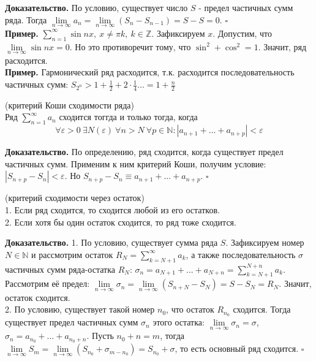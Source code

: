 \textbf{Доказательство.} По условию, существует число $S$ - предел частичных 
сумм ряда.
Тогда $\lim\limits_{n \to \infty}a_n=\lim\limits_{n \to \infty}(S_{n}-S_{n-1})
=S-S=0$. 
$\square$\\
\textbf{Пример.} $\sum\limits_{n=1}^{\infty} \sin{nx},~x\ne\pi k,~k 
\in\mathbb{Z}$. 
Зафиксируем $x$. Допустим, что $\lim\limits_{n \to \infty}\sin nx=0 $. 
Но это противоречит тому, что $\sin^2+\cos^2=1$. Значит, ряд расходится.\\
\textbf{Пример.} Гармонический ряд расходится, т.к. расходится 
последовательность частичных сумм: 
$S_{2^n}>1+\frac{1}{2}+2\cdot \frac{1}{4}\ldots=1+\frac{n}{2}$
\begin{theor} (критерий Коши сходимости ряда)\\
Ряд $\sum\limits_{n=1}^{\infty} a_n$ сходится тоггда и только тогда, когда
$$\forall\varepsilon>0~\exists N(\varepsilon)~\forall n>N~\forall p\in
\mathbb{N}:|a_{n+1}+\ldots+a_{n+p}|<\varepsilon$$
\end{theor}
\textbf{Доказательство.} По определению, ряд сходится, когда существует предел
частичных сумм. Применим к ним критерий Коши, получим условие: 
$|S_{n+p}-S_n|<\varepsilon$. Но $S_{n+p}-S_n\equiv a_{n+1}+...+a_{n+p}$.
$\square$ 
\begin{theor} (критерий сходимости через остаток)\\
    1. Если ряд сходится, то сходится любой из его остатков.\\
    2. Если хотя бы один остаток сходится, то ряд тоже сходится.
\end{theor}
\textbf{Доказательство.}
1. По условию, существует сумма ряда $S$. Зафиксируем номер $N\in\mathbb{N}$ и 
рассмотрим остаток $R_N=\sum\limits_{k=N+1}^{\infty} a_k$, а также 
последовательность $\sigma$ частичных сумм ряда-остатка $R_N$: 
$\sigma_n=a_{N+1}+...+a_{N+n}=\sum\limits_{k=N+1}^{N+n} a_k$.
Рассмотрим её предел:
$\lim\limits_{n \to \infty} \sigma_n=\lim\limits_{n \to \infty}(S_{n+N}-S_N)
=S-S_N=R_N$. Значит, остаток сходится.\\
2. По условию, существует такой номер $n_0$, что остаток $R_{n_0}$ сходится.
Тогда существует предел частичных сумм $\sigma_n$ этого остатка:
$\lim\limits_{n \to \infty}\sigma_n=\sigma$, 
$\sigma_n=a_{n_0}+\ldots+a_{n_0+n}$. Пусть $n_0+n=m$, тогда
$\lim\limits_{n \to \infty}S_m=\lim\limits_{n \to \infty}
(S_{n_0}+\sigma_{m-n_0})=S_{n_0}+\sigma$, то есть основный ряд сходится.
$\square$ 











